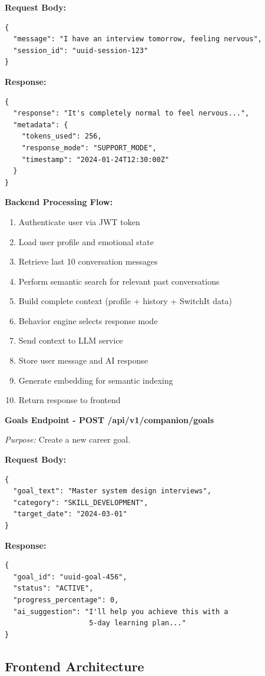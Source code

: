 \documentclass[12pt,a4paper]{article}
\begin{document}
\textbf{Request Body:}
\begin{verbatim}
{
  "message": "I have an interview tomorrow, feeling nervous",
  "session_id": "uuid-session-123"
}
\end{verbatim}

\textbf{Response:}
\begin{verbatim}
{
  "response": "It's completely normal to feel nervous...",
  "metadata": {
    "tokens_used": 256,
    "response_mode": "SUPPORT_MODE",
    "timestamp": "2024-01-24T12:30:00Z"
  }
}
\end{verbatim}

\textbf{Backend Processing Flow:}
\begin{enumerate}
    \item Authenticate user via JWT token
    \item Load user profile and emotional state
    \item Retrieve last 10 conversation messages
    \item Perform semantic search for relevant past conversations
    \item Build complete context (profile + history + SwitchIt data)
    \item Behavior engine selects response mode
    \item Send context to LLM service
    \item Store user message and AI response
    \item Generate embedding for semantic indexing
    \item Return response to frontend
\end{enumerate}

\textbf{Goals Endpoint - POST /api/v1/companion/goals}

\textit{Purpose:} Create a new career goal.

\textbf{Request Body:}
\begin{verbatim}
{
  "goal_text": "Master system design interviews",
  "category": "SKILL_DEVELOPMENT",
  "target_date": "2024-03-01"
}
\end{verbatim}

\textbf{Response:}
\begin{verbatim}
{
  "goal_id": "uuid-goal-456",
  "status": "ACTIVE",
  "progress_percentage": 0,
  "ai_suggestion": "I'll help you achieve this with a 
                    5-day learning plan..."
}
\end{verbatim}

\subsection{Frontend Architecture}
\end{document}
